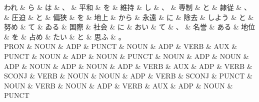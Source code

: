 \documentclass[tikz,border=5pt]{standalone}
\begin{document}
\small
\begin{dependency}[edge unit distance=6.4pt]
    \begin{deptext}[column sep=0.5em]
        われ \& ら \& は \& 、 \& 平和 \& を \& 維持 \& し \& 、 \& 専制 \& と \& 隷従 \& 、 \& 圧迫 \& と \& 偏狭 \& を \& 地上 \& から \& 永遠 \& に \& 除去 \& しよう \& と \& 努め \& て \& ゐる \& 国際 \& 社会 \& に \& おい \& て \& 、 \& 名誉 \& ある \& 地位 \& を \& 占め \& たい \& と \& 思ふ \& 。\\
        PRON \& NOUN \& ADP \& PUNCT \& NOUN \& ADP \& VERB \& AUX \& PUNCT \& NOUN \& ADP \& NOUN \& PUNCT \& NOUN \& ADP \& NOUN \& ADP \& NOUN \& ADP \& NOUN \& ADP \& VERB \& AUX \& ADP \& VERB \& SCONJ \& VERB \& NOUN \& NOUN \& ADP \& VERB \& SCONJ \& PUNCT \& NOUN \& VERB \& NOUN \& ADP \& VERB \& AUX \& ADP \& NOUN \& PUNCT\\
    \end{deptext}
\end{dependency}
\end{document}
